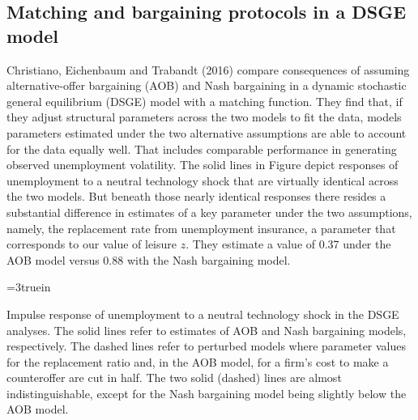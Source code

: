 \subsection{Matching and bargaining protocols in a  DSGE model}
Christiano, Eichenbaum and Trabandt (2016) compare consequences
of assuming
alternative-offer bargaining (AOB) and Nash bargaining
in a dynamic stochastic general equilibrium (DSGE)
model with a matching function. They find that,  if they adjust structural parameters across the two models  to  fit the  data,
 models parameters estimated under   the two alternative assumptions are  able to account for
the data equally well. That  includes comparable performance in   generating observed  unemployment volatility.
The solid lines in Figure 
depict responses of unemployment to a neutral technology
shock that are virtually identical across the two models.
But  beneath those nearly identical responses there resides  a substantial difference in estimates of a key parameter under
the two assumptions, namely,
the replacement rate from unemployment insurance, a parameter that
corresponds to our value of leisure $z$. They estimate a value of  0.37 under the AOB
model versus 0.88 with the Nash bargaining model.
%




\centerline{\epsfxsize=3truein}
\caption{Impulse response of unemployment to a neutral
technology shock in the DSGE analyses. The solid lines refer
to estimates of   AOB and Nash bargaining models,
respectively. The
dashed lines refer to perturbed models where parameter
values for the replacement ratio and,  in the AOB model, 
for a firm's cost to make a counteroffer are cut in half. The
two solid (dashed) lines are almost indistinguishable, except for the Nash bargaining model being slightly below
the AOB model.}
\endfigure


